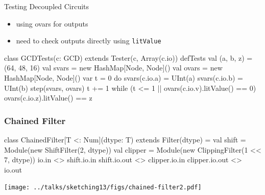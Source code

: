 \documentclass[xcolor=pdflatex,dvipsnames,table]{beamer}
\begin{document}
\begin{frame}[fragile]{Testing Decoupled Circuits}

\begin{itemize}
\item using ovars for outputs
\item need to check outputs directly using \verb+litValue+
\end{itemize}
\begin{scala}
class GCDTests(c: GCD) extends Tester(c, Array(c.io)) {
  defTests {
    val (a, b, z) = (64, 48, 16)
    val svars = new HashMap[Node, Node]()
    val ovars = new HashMap[Node, Node]()
    var t = 0
    do {
      svars(c.io.a) = UInt(a)
      svars(c.io.b) = UInt(b)
      step(svars, ovars)
      t += 1
    } while (t <= 1 || ovars(c.io.v).litValue() == 0)
    ovars(c.io.z).litValue() == z
  }
}
\end{scala}

\end{frame}

\begin{frame}[fragile]
\frametitle{Chained Filter}

\begin{footnotesize}
\begin{scala}
class ChainedFilter[T <: Num](dtype: T) extends Filter(dtype) = {
  val shift   = Module(new ShiftFilter(2, dtype))
  val clipper = Module(new ClippingFilter(1 << 7, dtype))
  io.in          <> shift.io.in
  shift.io.out   <> clipper.io.in
  clipper.io.out <> io.out
}
\end{scala}
\end{footnotesize}

\begin{center}
\texttt{[image: ../talks/sketching13/figs/chained-filter2.pdf]} 
\end{center}
\end{frame}
\end{document}
